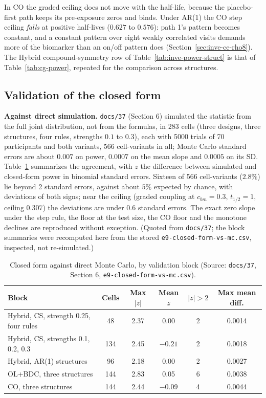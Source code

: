 \documentclass[11pt]{article}
\newcommand{\code}[1]{\texttt{#1}}
\begin{document}
In CO the graded ceiling does not move with the half-life, because the
placebo-first path keeps its pre-exposure zeros and binds. Under AR(1)
the CO step ceiling \emph{falls} at positive half-lives ($0.627$ to
$0.576$): path 1's pattern becomes constant, and a constant pattern
over eight weakly correlated visits demands more of the biomarker than
an on/off pattern does (Section~\ref{sec:inve-ce-rho8}). The
Hybrid compound-symmetry row of Table~\ref{tab:inve-power-struct} is
that of Table~\ref{tab:cg-power}, repeated for the comparison across
structures.

\subsection{Validation of the closed form}
\label{sec:inve-cg-validation}

\textbf{Against direct simulation.} \code{docs/37} (Section 6)
simulated the statistic from the full joint distribution, not from the
formulas, in 283 cells (three designs, three structures, four rules,
strengths $0.1$ to $0.3$), each with 5000 trials of 70 participants and
both variants, 566 cell-variants in all; Monte Carlo standard errors
are about $0.007$ on power, $0.0007$ on the mean slope and $0.0005$ on
its SD. Table~\ref{tab:inve-mc} summarizes the agreement, with $z$ the
difference between simulated and closed-form power in binomial standard
errors. Sixteen of 566 cell-variants ($2.8\%$) lie beyond 2 standard
errors, against about $5\%$ expected by chance, with deviations of both
signs; near the ceiling (graded coupling at $c_{bm} = 0.3$,
$t_{1/2} = 1$, ceiling $0.307$) the deviations are under $0.6$ standard
errors. The exact zero slope under the step rule, the floor at the test
size, the CO floor and the monotone declines are reproduced without
exception. (Quoted from \code{docs/37}; the block summaries were
recomputed here from the stored
\code{e9-closed-form-vs-mc.csv}, inspected, not re-simulated.)

\begin{table}[h]
\centering\small
\caption{Closed form against direct Monte Carlo, by validation block
(Source: \code{docs/37}, Section 6, \code{e9-closed-form-vs-mc.csv}).}
\label{tab:inve-mc}
\begin{tabular}{@{}lccccc@{}}
\toprule
Block & Cells & Max $|z|$ & Mean $z$ & $|z| > 2$ & Max mean diff. \\
\midrule
Hybrid, CS, strength 0.25, four rules & 48 & 2.37 & 0.00 & 2 & 0.0014 \\
Hybrid, CS, strengths 0.1, 0.2, 0.3 & 134 & 2.45 & $-0.21$ & 2 & 0.0018 \\
Hybrid, AR(1) structures & 96 & 2.18 & 0.00 & 2 & 0.0027 \\
OL+BDC, three structures & 144 & 2.83 & 0.05 & 6 & 0.0038 \\
CO, three structures & 144 & 2.44 & $-0.09$ & 4 & 0.0044 \\
\bottomrule
\end{tabular}
\end{table}
\end{document}
